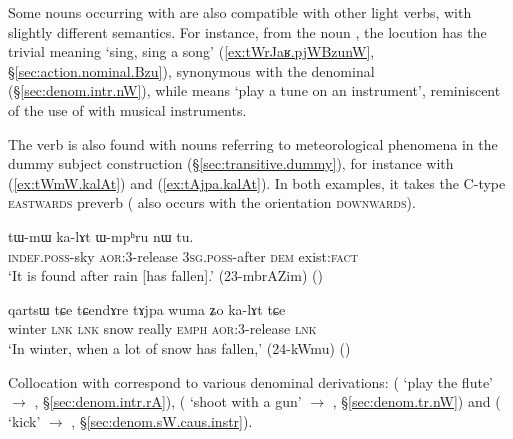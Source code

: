Some nouns occurring with  are also compatible with other light verbs, with slightly different semantics. For instance, from the noun , the locution  has the trivial meaning `sing, sing a song' (\ref{ex:tWrJaʁ.pjWBzunW}, §\ref{sec:action.nominal.Bzu}), synonymous with the denominal   (§\ref{sec:denom.intr.nW}), while  means `play a tune on an instrument', reminiscent of the use of   with musical instruments.
  
 
 The verb   is also found with nouns referring to meteorological phenomena in the dummy subject construction (§\ref{sec:transitive.dummy}), for instance with   (\ref{ex:tWmW.kalAt})  and   (\ref{ex:tAjpa.kalAt}). In both examples, it takes the C-type  \textsc{eastwards} preverb   ( also occurs with the orientation \textsc{downwards}).

\begin{exe}
\ex \label{ex:tWmW.kalAt}
\gll  tɯ-mɯ ka-lɤt ɯ-mpʰru nɯ tu. \\
\textsc{indef}.\textsc{poss}-sky \textsc{aor}:3\flobv{}-release \textsc{3sg}.\textsc{poss}-after \textsc{dem} exist:\textsc{fact} \\
\glt `It is found after rain [has fallen].' (23-mbrAZim)
()
\end{exe}

\begin{exe}
\ex \label{ex:tAjpa.kalAt}
\gll qartsɯ tɕe tɕendɤre tɤjpa wuma ʑo ka-lɤt tɕe \\
winter \textsc{lnk} \textsc{lnk} snow really \textsc{emph} \textsc{aor}:3\flobv{}-release \textsc{lnk} \\
\glt `In winter, when a lot of snow has fallen,' (24-kWmu)
()
\end{exe}

Collocation with  correspond to various denominal derivations:  ( `play the flute' $\rightarrow$ , §\ref{sec:denom.intr.rA}),  ( `shoot with a gun' $\rightarrow$ , §\ref{sec:denom.tr.nW}) and  ( `kick'  $\rightarrow$ , §\ref{sec:denom.sW.caus.instr}).

